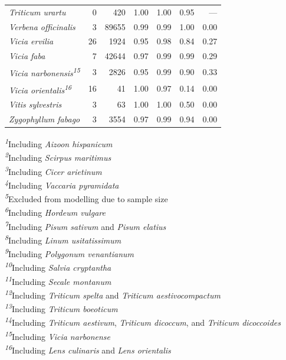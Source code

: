 \documentclass[
  authoryear,
  preprint]{elsarticle}
\begin{document}
\begin{longtable}{@{\extracolsep{\fill}}lrrrrrr}
{\itshape Triticum urartu} & 0 & 420 & 1.00 & 1.00 & 0.95 & — \\ 
{\itshape Verbena officinalis} & 3 & 89655 & 0.99 & 0.99 & 1.00 & 0.00 \\ 
{\itshape Vicia ervilia} & 26 & 1924 & 0.95 & 0.98 & 0.84 & 0.27 \\ 
{\itshape Vicia faba} & 7 & 42644 & 0.97 & 0.99 & 0.99 & 0.29 \\ 
{\itshape Vicia narbonensis}\textsuperscript{\textit{15}} & 3 & 2826 & 0.95 & 0.99 & 0.90 & 0.33 \\ 
{\itshape Vicia orientalis}\textsuperscript{\textit{16}} & 16 & 41 & 1.00 & 0.97 & 0.14 & 0.00 \\ 
{\itshape Vitis sylvestris} & 3 & 63 & 1.00 & 1.00 & 0.50 & 0.00 \\ 
{\itshape Zygophyllum fabago} & 3 & 3554 & 0.97 & 0.99 & 0.94 & 0.00 \\ 
\bottomrule

\end{longtable}

\begin{minipage}{\linewidth}
\textsuperscript{\textit{1}}Including \emph{Aizoon hispanicum}\\
\textsuperscript{\textit{2}}Including \emph{Scirpus maritimus}\\
\textsuperscript{\textit{3}}Including \emph{Cicer arietinum}\\
\textsuperscript{\textit{4}}Including \emph{Vaccaria pyramidata}\\
\textsuperscript{\textit{5}}Excluded from modelling due to sample size\\
\textsuperscript{\textit{6}}Including \emph{Hordeum vulgare}\\
\textsuperscript{\textit{7}}Including \emph{Pisum sativum} and \emph{Pisum elatius}\\
\textsuperscript{\textit{8}}Including \emph{Linum usitatissimum}\\
\textsuperscript{\textit{9}}Including \emph{Polygonum venantianum}\\
\textsuperscript{\textit{10}}Including \emph{Salvia cryptantha}\\
\textsuperscript{\textit{11}}Including \emph{Secale montanum}\\
\textsuperscript{\textit{12}}Including \emph{Triticum spelta} and \emph{Triticum aestivocompactum}\\
\textsuperscript{\textit{13}}Including \emph{Triticum boeoticum}\\
\textsuperscript{\textit{14}}Including \emph{Triticum aestivum}, \emph{Triticum dicoccum}, and \emph{Triticum dicoccoides}\\
\textsuperscript{\textit{15}}Including \emph{Vicia narbonense}\\
\textsuperscript{\textit{16}}Including \emph{Lens culinaris} and \emph{Lens orientalis}\\
\end{minipage}
\endgroup
\end{document}
